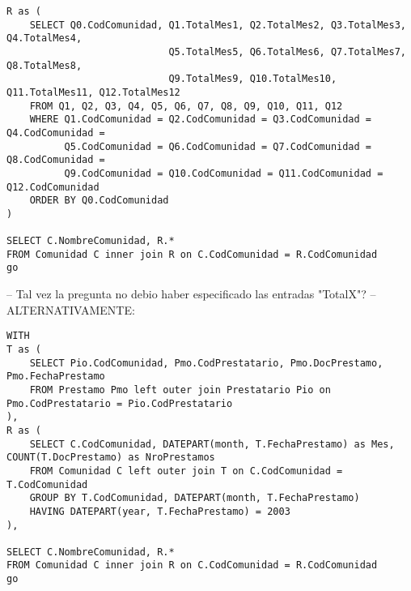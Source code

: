 \begin{enumerate}
\begin{verbatim}
R as (
    SELECT Q0.CodComunidad, Q1.TotalMes1, Q2.TotalMes2, Q3.TotalMes3, Q4.TotalMes4,
                            Q5.TotalMes5, Q6.TotalMes6, Q7.TotalMes7, Q8.TotalMes8,
                            Q9.TotalMes9, Q10.TotalMes10, Q11.TotalMes11, Q12.TotalMes12
    FROM Q1, Q2, Q3, Q4, Q5, Q6, Q7, Q8, Q9, Q10, Q11, Q12
    WHERE Q1.CodComunidad = Q2.CodComunidad = Q3.CodComunidad = Q4.CodComunidad =
          Q5.CodComunidad = Q6.CodComunidad = Q7.CodComunidad = Q8.CodComunidad =
          Q9.CodComunidad = Q10.CodComunidad = Q11.CodComunidad = Q12.CodComunidad
    ORDER BY Q0.CodComunidad
)

SELECT C.NombreComunidad, R.*
FROM Comunidad C inner join R on C.CodComunidad = R.CodComunidad
go
\end{verbatim}

-- Tal vez la pregunta no debio haber especificado las entradas "TotalX"?
-- ALTERNATIVAMENTE:
\begin{verbatim}
WITH
T as (
    SELECT Pio.CodComunidad, Pmo.CodPrestatario, Pmo.DocPrestamo, Pmo.FechaPrestamo
    FROM Prestamo Pmo left outer join Prestatario Pio on Pmo.CodPrestatario = Pio.CodPrestatario
),
R as (
    SELECT C.CodComunidad, DATEPART(month, T.FechaPrestamo) as Mes, COUNT(T.DocPrestamo) as NroPrestamos
    FROM Comunidad C left outer join T on C.CodComunidad = T.CodComunidad
    GROUP BY T.CodComunidad, DATEPART(month, T.FechaPrestamo)
    HAVING DATEPART(year, T.FechaPrestamo) = 2003
),

SELECT C.NombreComunidad, R.*
FROM Comunidad C inner join R on C.CodComunidad = R.CodComunidad
go
\end{verbatim}

\end{enumerate}
